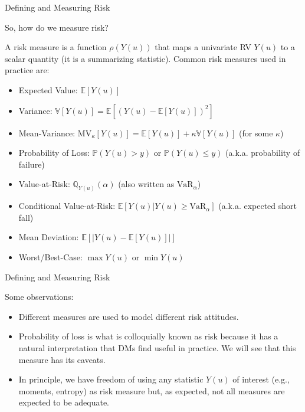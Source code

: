 \documentclass[9pt]{beamer}
\begin{document}
%
\begin{frame}{Defining and Measuring Risk}
\begin{block}{}
So, how do we measure risk? 
\end{block}

A risk measure is a function $\rho(Y(u))$ that maps a univariate RV $Y(u)$ to a scalar quantity (it is a summarizing statistic). Common risk measures used in practice are:
\begin{itemize}
\item Expected Value: $\mathbb{E}[Y(u)]$
\item Variance: $\mathbb{V}[Y(u)]=\mathbb{E}[(Y(u)-\mathbb{E}[Y(u)])^2]$
\item Mean-Variance: $\textrm{MV}_\kappa[Y(u)]=\mathbb{E}[Y(u)]+\kappa \mathbb{V}[Y(u)]$ (for some $\kappa$)
\item Probability of Loss: $\mathbb{P}(Y(u)>y)$ or $\mathbb{P}(Y(u)\leq y)$ (a.k.a. probability of failure)
\item Value-at-Risk: $\mathbb{Q}_{Y(u)}(\alpha)$ (also written as $\textrm{VaR}_\alpha$)
\item Conditional Value-at-Risk: $\mathbb{E}[Y(u)|Y(u)\geq \textrm{VaR}_\alpha]$ (a.k.a. expected short fall) 
\item Mean Deviation:  $\mathbb{E}[|Y(u)-\mathbb{E}[Y(u)]|]$
\item Worst/Best-Case: $\max Y(u)$ or $\min Y(u)$
\end{itemize}

\end{frame}

%
\begin{frame}{Defining and Measuring Risk}

Some observations:
\begin{itemize}
\item Different measures are used to model different risk attitudes. 

\item Probability of loss is what is colloquially known as risk because it has a natural interpretation that DMs find useful in practice. We will see that this measure has its caveats. 

\item In principle, we have freedom of using any statistic $Y(u)$ of interest (e.g., moments, entropy) as risk measure but, as expected, not all measures are expected to be adequate.   
\end{itemize}

\end{frame}
\end{document}

